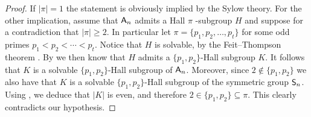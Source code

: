 \documentclass[12pt]{amsart}
\theoremstyle{definition}
\numberwithin{equation}{section}
\newcommand{\Al}{\textup{\textsf{A}}}
\newcommand{\Sy}{\textup{\textsf{S}}}
\begin{document}
\begin{proof}
If $|\pi|=1$ the %
statement is obviously implied by the Sylow theory.
For the other implication, assume that $\Al_n$ admits %
a Hall
$\pi$%
-subgroup $H$ and suppose for a contradiction that $|\pi|\geq
2$. %
In particular let %
$\pi=\{p_1,p_2,\ldots, p_t\}$ for some odd
primes $p_1<p_2<\cdots<p_t$. %
Notice that $H$ %
is solvable, by the %
Feit--Thompson %
theorem
\cite{Thompson63}. By \cite{Hall1} we %
then know that $H$ admits a
$\{p_1,p_2\}$-Hall subgroup $K$. It follows that $K$ is a solvable
$\{p_1,p_2\}$-Hall subgroup of $\Al_n$. Moreover, %
since $2\notin
\{p_1,p_2\}$ we also %
have that $K$ is a solvable $\{p_1,p_2\}$-Hall
subgroup of the symmetric group $\Sy_n$. Using \cite[Theorem
A4]{Hall2}, we deduce that $|K|$ is even, and therefore $2\in
\{p_1,p_2\}\subseteq \pi$. %
This clearly contradicts %
our hypothesis.
%
%
\end{proof}
\end{document}
